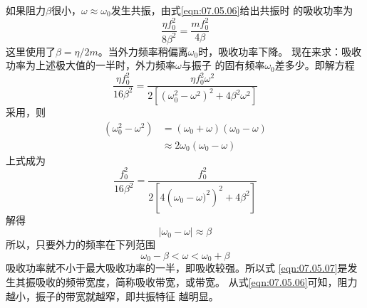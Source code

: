 如果阻力$ \beta $很小，$ \omega \approx \omega _ { 0 } $发生共振，由式\eqref{eqn:07.05.06}给出共振时
的吸收功率为
\begin{equation*}
    \frac { \eta f _ { 0 } ^ { 2 } } { 8 \beta ^ { 2 } } = \frac { m f _ { 0 } ^ { 2 } } { 4 \beta }
\end{equation*}
这里使用了$ \beta = \eta / 2 m $。当外力频率稍偏离$\omega_{ 0 }$时，吸收功率下降。
现在来求：吸收功率为上述极大值的一半时，外力频率$ \omega $与振子
的固有频率$ \omega_{ 0 } $差多少。即解方程
\begin{equation*}
    \frac { \eta f _ { 0 } ^ { 2 } } { 16 \beta ^ { 2 } }  = \frac { \eta f _ { 0 } ^ { 2 } \omega ^ { 2 } } { 2 \left[ \left( \omega_{ 0 } ^ { 2 } - \omega ^ { 2 } \right) ^ { 2 } + 4 \beta ^ { 2 } \omega ^ { 2 } \right] }
\end{equation*}
采用，则
\begin{equation*}
    \begin{aligned}
    \left( \omega _ { 0 } ^ { 2 } - \omega ^ { 2 } \right) &= \left( \omega _ { 0 } + \omega \right) \left( \omega _ { 0 } - \omega \right) \\
    &\approx 2 \omega _ { 0 } \left( \omega _ { 0 } - \omega \right)
    \end{aligned}
\end{equation*}
上式成为
\begin{equation*}
    \frac { f _ { 0 } ^ { 2 } } { 16 \beta ^ { 2 } }  = \frac { f _ { 0 } ^ { 2 } } { 2 \left[ 4 \left( \omega_{ 0 } - \omega ) ^ { 2 } \right) ^ { 2 } + 4 \beta ^ { 2 } \right] }
\end{equation*}
解得
\begin{equation*}
    \left| \omega _ { 0 } - \omega \right| \approx \beta
\end{equation*}
所以，只要外力的频率在下列范围
\begin{equation}\label{eqn:07.05.07}
    \omega _ { 0 } - \beta < \omega < \omega _ { 0 } + \beta
\end{equation}
吸收功率就不小于最大吸收功率的一半，即吸收较强。所以式
\eqref{eqn:07.05.07}是发生其振吸收的频带宽度，简称吸收带宽，或带宽。
从式\eqref{eqn:07.05.06}可知，阻力越小，振子的带宽就越窄，即共振特征
越明显。